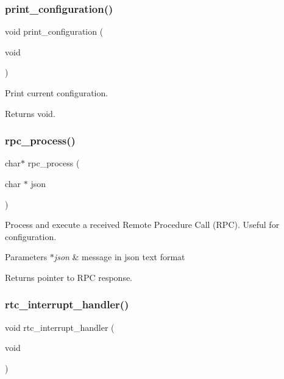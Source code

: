 \subsubsection{\texorpdfstring{print\+\_\+configuration()}{print\_configuration()}}
{\footnotesize\ttfamily void print\+\_\+configuration (\begin{DoxyParamCaption}\item[{void}]{ }\end{DoxyParamCaption})}



Print current configuration. 

\begin{DoxyReturn}{Returns}
void. 
\end{DoxyReturn}
\mbox{\label{rmap_8ino_a99f56f4c38f64be47b52818cbf57bb2d}} 
\subsubsection{\texorpdfstring{rpc\+\_\+process()}{rpc\_process()}}
{\footnotesize\ttfamily char$\ast$ rpc\+\_\+process (\begin{DoxyParamCaption}\item[{char $\ast$}]{json }\end{DoxyParamCaption})}



Process and execute a received Remote Procedure Call (R\+PC). Useful for configuration. 


\begin{DoxyParams}{Parameters}
{\em $\ast$json} & message in json text format \\
\hline
\end{DoxyParams}
\begin{DoxyReturn}{Returns}
pointer to R\+PC response. 
\end{DoxyReturn}
\mbox{\label{rmap_8ino_a17374e428acd4fc86f2b8a8ede54deca}} 
\subsubsection{\texorpdfstring{rtc\+\_\+interrupt\+\_\+handler()}{rtc\_interrupt\_handler()}}
{\footnotesize\ttfamily void rtc\+\_\+interrupt\+\_\+handler (\begin{DoxyParamCaption}\item[{void}]{ }\end{DoxyParamCaption})}



